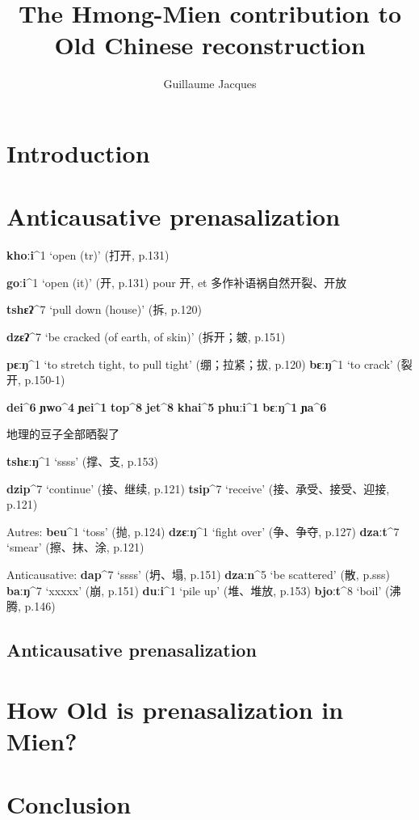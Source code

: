 \documentclass[oneside,a4paper,11pt]{article}
\newcommand{\ipa}[1]{\textbf{{\phon\mbox{#1}}}} %
\newcommand{\zh}[1]{{\cn #1}}
\newcommand{\mien}[5]{\ipa{#1}^{#2} `#3' (\zh{#4}, p.#5)}
\begin{document}
\title{The Hmong-Mien contribution to Old Chinese reconstruction}
\author{Guillaume Jacques}
\maketitle

\section*{Introduction}
\citet{sagart03prenasalized}
\citet{maozw92mien}
\citet{ratliff10protohm}
\citet{wang95protomy}
\section{Anticausative prenasalization}
\citet[14-16]{downer73loanwords}

\citet{wanglz12jieci}
 
\mien{khoːi}{1}{open (tr)}{打开}{131} 

\mien{goːi}{1}{open (it)}{开}{131}  pour 开, et
\zh{多作补语祸自然开裂、开放}

\mien{tshɛʔ}{7}{pull down (house)}{拆}{120}
 
\mien{dzɛʔ}{7}{be cracked (of earth, of skin)}{拆开；皴}{151}

\mien{pɛːŋ}{1}{to stretch tight, to pull tight}{绷；拉紧；拔}{120}
\mien{bɛːŋ}{1}{to crack}{裂开}{150-1}
 
\ipa{dei^6} \ipa{ɲwo^4} \ipa{ɲei^1} \ipa{top^8} \ipa{jet^8} \ipa{khai^5} \ipa{phuːi^1} \ipa{bɛːŋ^1} \ipa{ɲa^6}
 
 \zh{地理的豆子全部晒裂了}

\mien{tshɛːŋ}{1}{ssss}{撑、支}{153} 

\mien{dzip}{7}{continue}{接、继续}{121}
\mien{tsip}{7}{receive}{接、承受、接受、迎接}{121}


Autres:
\mien{beu}{1}{toss}{抛}{124} 
\mien{dzɛːŋ}{1}{fight over}{争、争夺}{127} 
\mien{dzaːt}{7}{smear}{擦、抹、涂}{121} 

Anticausative:
\mien{dap}{7}{ssss}{坍、塌}{151} 
\mien{dzaːn}{5}{be scattered}{散}{sss}
\mien{baːŋ}{7}{xxxxx}{崩}{151} 
\mien{duːi}{1}{pile up}{堆、堆放}{153} 
\mien{bjoːt}{8}{boil}{沸腾}{146} 
\subsection{Anticausative prenasalization}
\citet[193-4]{jacques15causative}
\citet[285-288]{jacques15spontaneous}
\citet{jacques15derivational.khaling}

\section{How Old is prenasalization in Mien?}

\section*{Conclusion}



\end{document}
